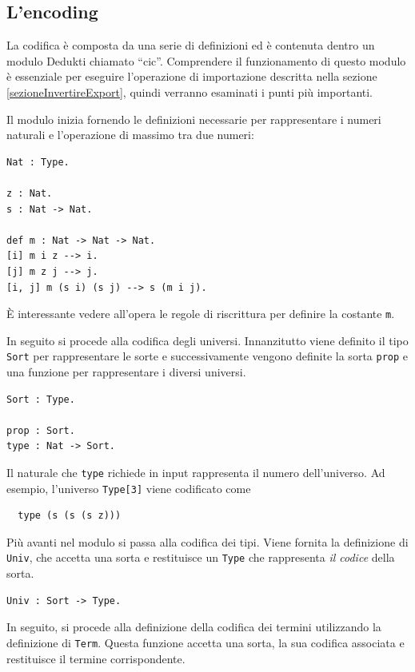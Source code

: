 \documentclass[12pt,a4paper]{mimosis}
\begin{document}
\subsection{L'encoding}\label{sottosezioneEncoding}
La codifica è composta da una serie di definizioni ed è contenuta dentro 
un modulo Dedukti chiamato ``cic''. 
Comprendere il funzionamento di questo modulo è essenziale per eseguire l'operazione
di importazione descritta nella sezione \ref{sezioneInvertireExport}, quindi 
verranno esaminati i punti più importanti.

Il modulo inizia fornendo le definizioni necessarie per rappresentare i numeri
naturali e l'operazione di massimo tra due numeri:

\begin{lstlisting}
Nat : Type.

z : Nat.
s : Nat -> Nat.

def m : Nat -> Nat -> Nat.
[i] m i z --> i.
[j] m z j --> j.
[i, j] m (s i) (s j) --> s (m i j).
\end{lstlisting}

È interessante vedere all'opera le regole di riscrittura per definire la costante
\texttt{m}. 

In seguito si procede alla codifica degli universi. Innanzitutto viene definito
il tipo \texttt{Sort} per rappresentare le sorte e successivamente vengono definite
la sorta \texttt{prop} e una funzione per rappresentare i diversi universi.

\begin{lstlisting}
Sort : Type.

prop : Sort.
type : Nat -> Sort.
\end{lstlisting}

Il naturale che \texttt{type} richiede in input rappresenta il numero dell'universo.
Ad esempio, l'universo \texttt{Type[3]} viene codificato come
\begin{lstlisting}
  type (s (s (s z)))
\end{lstlisting}

Più avanti nel modulo si passa alla codifica dei tipi.
Viene fornita la definizione di \texttt{Univ}, che accetta una sorta e restituisce 
un \texttt{Type} che rappresenta \textit{il codice} della sorta.

\begin{lstlisting}
Univ : Sort -> Type.
\end{lstlisting}

In seguito, si procede alla definizione della codifica dei termini utilizzando 
la definizione di \texttt{Term}. Questa funzione accetta una sorta, la sua
codifica associata e restituisce il termine corrispondente.
\end{document}
